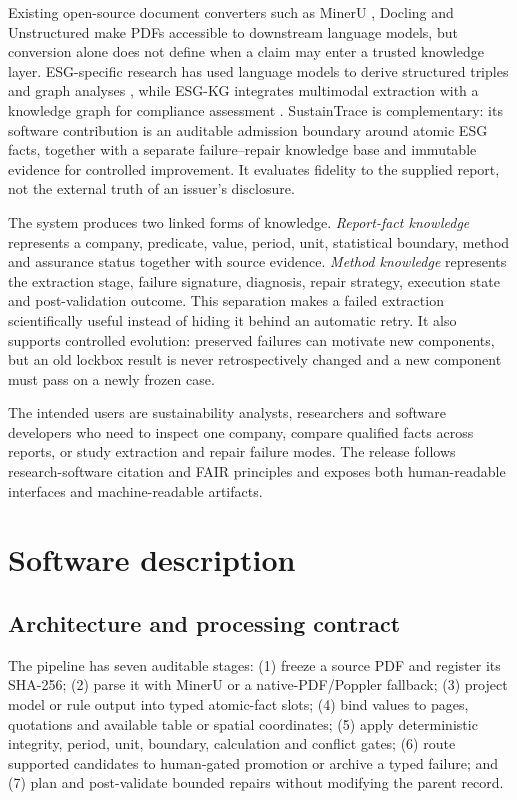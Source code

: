 \documentclass[a4paper,fleqn]{cas-sc}
\begin{document}
Existing open-source document converters such as MinerU \citep{wang2024mineru}, Docling
\citep{auer2024docling} and Unstructured \citep{unstructured2026} make PDFs accessible to
downstream language models, but conversion alone does not define when a claim may enter a trusted
knowledge layer. ESG-specific research has used language models to derive structured triples and
graph analyses \citep{bronzini2024glitter}, while ESG-KG integrates multimodal extraction with a
knowledge graph for compliance assessment \citep{chang2026esgkg}. SustainTrace is complementary:
its software contribution is an auditable admission boundary around atomic ESG facts, together
with a separate failure--repair knowledge base and immutable evidence for controlled improvement.
It evaluates fidelity to the supplied report, not the external truth of an issuer's disclosure.

The system produces two linked forms of knowledge. \emph{Report-fact knowledge} represents a
company, predicate, value, period, unit, statistical boundary, method and assurance status together
with source evidence. \emph{Method knowledge} represents the extraction stage, failure signature,
diagnosis, repair strategy, execution state and post-validation outcome. This separation makes a
failed extraction scientifically useful instead of hiding it behind an automatic retry. It also
supports controlled evolution: preserved failures can motivate new components, but an old lockbox
result is never retrospectively changed and a new component must pass on a newly frozen case.

The intended users are sustainability analysts, researchers and software developers who need to
inspect one company, compare qualified facts across reports, or study extraction and repair
failure modes. The release follows research-software citation and FAIR principles
\citep{smith2016software,barker2022fair} and exposes both human-readable interfaces and
machine-readable artifacts.

\section{Software description}\label{sec:software}

\subsection{Architecture and processing contract}

The pipeline has seven auditable stages: (1) freeze a source PDF and register its SHA-256;
(2) parse it with MinerU or a native-PDF/Poppler fallback; (3) project model or rule output into
typed atomic-fact slots; (4) bind values to pages, quotations and available table or spatial
coordinates; (5) apply deterministic integrity, period, unit, boundary, calculation and conflict
gates; (6) route supported candidates to human-gated promotion or archive a typed failure; and
(7) plan and post-validate bounded repairs without modifying the parent record.
\end{document}
